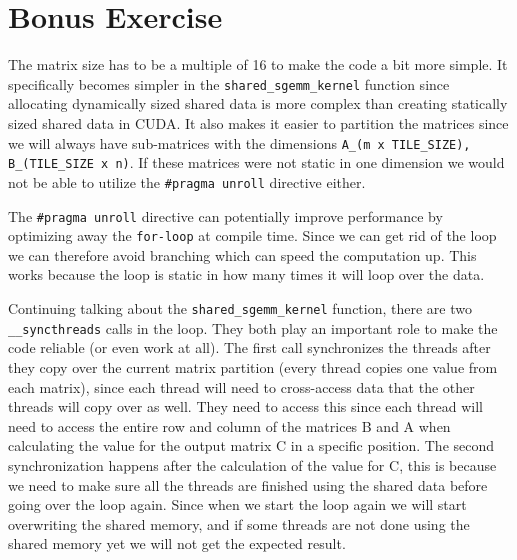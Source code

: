 \documentclass[a4paper, 12pt]{article}
\def\code#1{\texttt{#1}}
\begin{document}

%
%


\section{Bonus Exercise}
The matrix size has to be a multiple of 16 to make the code a bit more simple. It specifically becomes simpler in the \code{shared\_sgemm\_kernel} function since allocating dynamically sized shared data is more complex than creating statically sized shared data in CUDA. It also makes it easier to partition the matrices since we will always have sub-matrices with the dimensions \code{A\_(m x TILE\_SIZE), B\_(TILE\_SIZE x n)}. If these matrices were not static in one dimension we would not be able to utilize the \code{\#pragma unroll} directive either.

The \code{\#pragma unroll} directive can potentially improve performance by optimizing away the \code{for-loop} at compile time. Since we can get rid of the loop we can therefore avoid branching which can speed the computation up. This works because the loop is static in how many times it will loop over the data.

Continuing talking about the \code{shared\_sgemm\_kernel} function, there are two \code{\_\_syncthreads} calls in the loop. They both play an important role to make the code reliable (or even work at all). The first call synchronizes the threads after they copy over the current matrix partition (every thread copies one value from each matrix), since each thread will need to cross-access data that the other threads will copy over as well. They need to access this since each thread will need to access the entire row and column of the matrices B and A when calculating the value for the output matrix C in a specific position.
The second synchronization happens after the calculation of the value for C, this is because we need to make sure all the threads are finished using the shared data before going over the loop again. Since when we start the loop again we will start overwriting the shared memory, and if some threads are not done using the shared memory yet we will not get the expected result.
\end{document}
